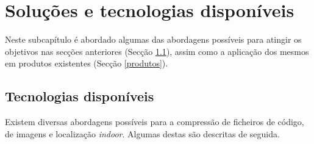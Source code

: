 \section{Soluções e tecnologias disponíveis} \label{solucoesDisponiveis}

Neste subcapítulo é abordado algumas das abordagens possíveis para atingir os objetivos nas secções anteriores (Secção \ref{compressaoFicheiros}), assim como a aplicação dos mesmos em produtos existentes (Secção \ref{produtos}).


\subsection{Tecnologias disponíveis} \label{compressaoFicheiros}

Existem diversas abordagens possíveis para a compressão de ficheiros de código, de imagens e localização \textit{indoor}. Algumas destas são descritas de seguida.

